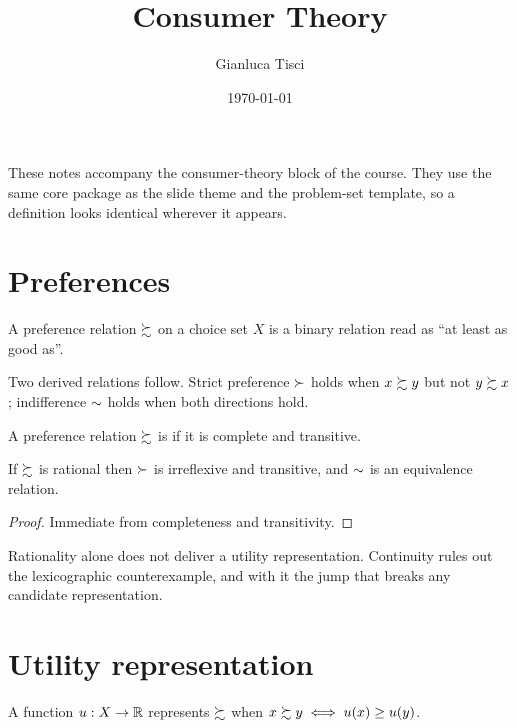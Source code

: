 \documentclass[11pt,a4paper]{article}
\title{Consumer Theory}
\author{Gianluca Tisci}
\date{\today}
\begin{document}
\maketitle

\tableofcontents
\listofboxes


These notes accompany the consumer-theory block of the course. They use the
same core package as the slide theme and the problem-set template, so a
definition looks identical wherever it appears.

\section{Preferences}

\para A preference relation $\succsim$ on a choice set $X$ is a binary
relation read as ``at least as good as''. 

\para Two derived relations follow. Strict preference $\succ$ holds when
$x \succsim y$ but not $y \succsim x$; indifference $\sim$ holds when
both directions hold.

\begin{definition}
A preference relation $\succsim$ is  if it is complete and
transitive.
\end{definition}

\begin{proposition}
If $\succsim$ is rational then $\succ$ is irreflexive and transitive,
and $\sim$ is an equivalence relation.
\end{proposition}

\begin{proof}
Immediate from completeness and transitivity. \qedhere
\end{proof}

\begin{notebox}
Rationality alone does not deliver a utility representation. Continuity rules
out the lexicographic counterexample, and with it the jump that breaks any
candidate representation.
\end{notebox}

\section{Utility representation}

\para A function $u : X \to \mathbb{R}$ represents $\succsim$ when
$x \succsim y \iff u(x) \ge u(y)$.
\end{document}
